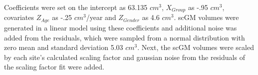 Coefficients were set on the intercept as 63.135 $cm^3$, $X_{Group}$ as -.95 $cm^3$, covariates $Z_{Age}$ as -.25 $cm^3$/year and $Z_{Gender}$ as 4.6 $cm^3$. scGM volumes were generated in a linear model using these coefficients and additional noise was added from the  residuals, which were sampled from a normal distribution with zero mean and standard deviation 5.03 $cm^3$. Next, the scGM volumes were scaled by each site's calculated scaling factor and gaussian noise from the residuals of the scaling factor fit were added.